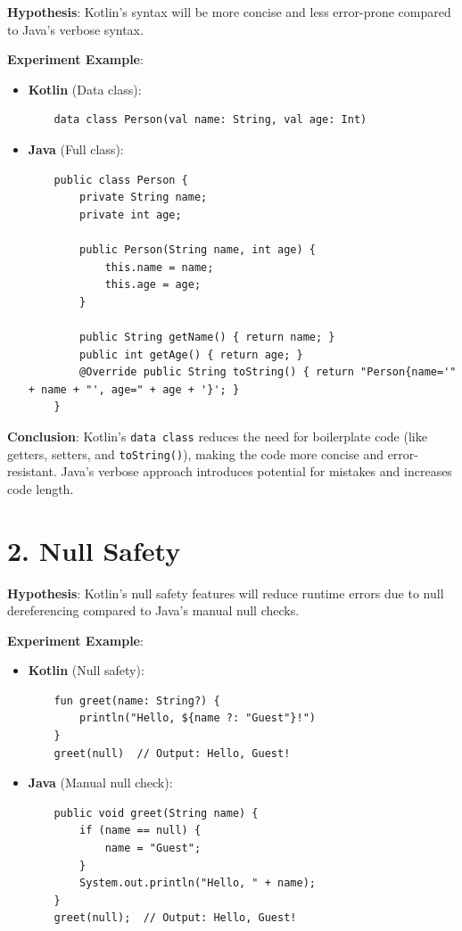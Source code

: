 \textbf{Hypothesis}: Kotlin's syntax will be more concise and less error-prone compared to Java’s verbose syntax.

\textbf{Experiment Example}:
\begin{itemize}
    \item \textbf{Kotlin} (Data class):
    \begin{verbatim}
    data class Person(val name: String, val age: Int)
    \end{verbatim}
    
    \item \textbf{Java} (Full class):
    \begin{verbatim}
    public class Person {
        private String name;
        private int age;

        public Person(String name, int age) {
            this.name = name;
            this.age = age;
        }

        public String getName() { return name; }
        public int getAge() { return age; }
        @Override public String toString() { return "Person{name='" + name + "', age=" + age + '}'; }
    }
    \end{verbatim}
\end{itemize}

\textbf{Conclusion}: Kotlin's \texttt{data class} reduces the need for boilerplate code (like getters, setters, and \texttt{toString()}), making the code more concise and error-resistant. Java’s verbose approach introduces potential for mistakes and increases code length.

\section*{2. Null Safety}

\textbf{Hypothesis}: Kotlin’s null safety features will reduce runtime errors due to null dereferencing compared to Java’s manual null checks.

\textbf{Experiment Example}:
\begin{itemize}
    \item \textbf{Kotlin} (Null safety):
    \begin{verbatim}
    fun greet(name: String?) {
        println("Hello, ${name ?: "Guest"}!")
    }
    greet(null)  // Output: Hello, Guest!
    \end{verbatim}
    
    \item \textbf{Java} (Manual null check):
    \begin{verbatim}
    public void greet(String name) {
        if (name == null) {
            name = "Guest";
        }
        System.out.println("Hello, " + name);
    }
    greet(null);  // Output: Hello, Guest!
    \end{verbatim}
\end{itemize}

